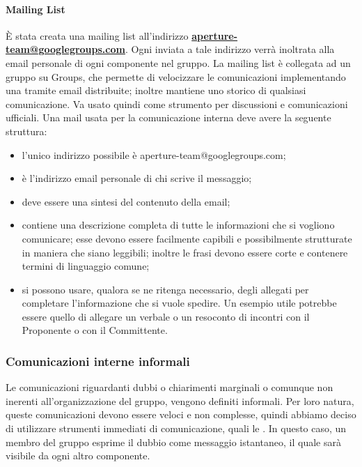 \paragraph{Mailing List}
È stata creata una mailing list all'indirizzo \textbf{\url{aperture-team@googlegroups.com}}.
Ogni  inviata a tale indirizzo verrà inoltrata alla email personale di ogni componente nel gruppo.
La mailing list è collegata ad un gruppo su  Groups, che permette di velocizzare le comunicazioni implementando una  tramite email distribuite; inoltre mantiene uno storico di qualsiasi comunicazione. Va usato quindi come strumento per discussioni e comunicazioni ufficiali.
Una mail usata per la comunicazione interna deve avere la seguente struttura:
\begin{itemize}
\item {} l'unico indirizzo possibile è aperture-team@googlegroups.com;
\item {} è l'indirizzo email personale di chi scrive il messaggio;
\item {} deve essere una sintesi del contenuto della email;
\item {} contiene una descrizione completa di tutte le informazioni che si vogliono comunicare; esse devono essere facilmente capibili e possibilmente strutturate in maniera che siano leggibili; inoltre le frasi devono essere corte e contenere termini di linguaggio comune;
\item {} si possono usare, qualora se ne ritenga necessario, degli allegati per completare l'informazione che si vuole spedire. Un esempio utile potrebbe essere quello di allegare un verbale o un resoconto di incontri con il Proponente  o con il Committente.
\end{itemize}


\subsubsection{Comunicazioni interne informali}
Le comunicazioni riguardanti dubbi o chiarimenti marginali o comunque non inerenti all'organizzazione del gruppo, vengono definiti informali. Per loro natura, queste comunicazioni devono essere veloci e non complesse, quindi abbiamo deciso di utilizzare strumenti immediati di comunicazione, quali le . In questo caso, un membro del gruppo esprime il dubbio come messaggio istantaneo, il quale sarà visibile da ogni altro componente.

